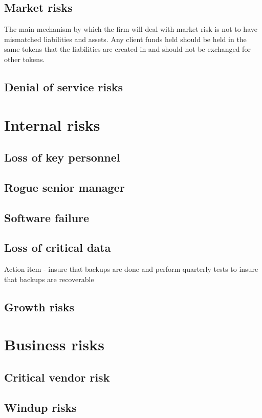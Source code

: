 \subsection{Market risks}

The main mechanism by which the firm will deal with market risk is not
to have mismatched liabilities and assets.  Any client funds held
should be held in the same tokens that the liabilities are created in
and should not be exchanged for other tokens.

\subsection{Denial of service risks}
\section{Internal risks}
\subsection{Loss of key personnel}
\subsection{Rogue senior manager}
\subsection{Software failure}
\subsection{Loss of critical data}

Action item - insure that backups are done and perform quarterly tests
to insure that backups are recoverable

\subsection{Growth risks}

\section{Business risks}
\subsection{Critical vendor risk}
\subsection{Windup risks}

